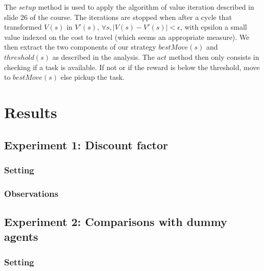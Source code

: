 \documentclass[11pt]{article}
\begin{document}
The $setup$ method is used to apply the algorithm of value iteration described in slide 26 of the course. The iterations are stopped when after a cycle that transformed $V(s)$ in $V'(s)$, $\forall s, |V(s)-V'(s)|<\epsilon$, with epsilon a small value indexed on the cost to travel (which seems an appropriate measure). We then extract the two components of our strategy $bestMove(s)$ and $threshold(s)$ as described in the analysis.
\newline
The $act$ method then only consists in checking if a task is available. If not or if the reward is below the threshold, move to $bestMove(s)$ else pickup the task.
\section{Results}

\subsection{Experiment 1: Discount factor}

\subsubsection{Setting}

\subsubsection{Observations}

\subsection{Experiment 2: Comparisons with dummy agents}

\subsubsection{Setting}
\end{document}
